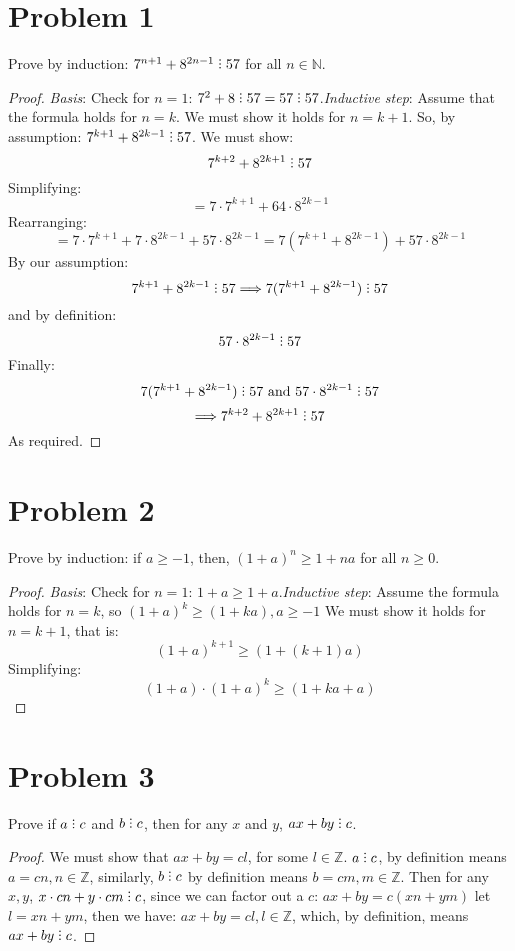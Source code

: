 \documentclass[12pt]{article}
\title{\scalebox{2}{Math 341 Exam 1}}
\author{\scalebox{1.5}{Theo Koss}}
\date{September 2020}
\newcommand{\N}{\mathbb{N}}
\newcommand{\Z}{\mathbb{Z}}
\newcommand{\divby}{%
  \mathrel{\text{\vbox{\baselineskip.65ex\lineskiplimit0pt\hbox{.}\hbox{.}\hbox{.}}}}%
  }
\begin{document}
\maketitle
\section{Problem 1}
Prove by induction: $7^{n+1}+8^{2n-1}\divby57$ for all $n\in\N$.
\begin{proof}
\emph{Basis}: Check for $n=1$: $7^2+8\divby57=57\divby57$.\newline \emph{Inductive step}: Assume that the formula holds for $n=k$. We must show it holds for $n=k+1$. So, by assumption: $7^{k+1}+8^{2k-1}\divby57$. We must show: $$7^{k+2}+8^{2k+1}\divby57$$ Simplifying:$$=7\cdot7^{k+1}+64\cdot8^{2k-1}$$ Rearranging:$$=7\cdot7^{k+1}+7\cdot8^{2k-1}+57\cdot8^{2k-1}=7(7^{k+1}+8^{2k-1})+57\cdot8^{2k-1}$$By our assumption:$$7^{k+1}+8^{2k-1}\divby57\Longrightarrow 7(7^{k+1}+8^{2k-1})\divby57$$ and by definition:$$57\cdot8^{2k-1}\divby57$$ Finally:$$7(7^{k+1}+8^{2k-1})\divby57\text{ and } 57\cdot8^{2k-1}\divby57$$ $$\Longrightarrow 7^{k+2}+8^{2k+1}\divby57$$ As required.
\end{proof}
\section{Problem 2}
Prove by induction: if $a\geq-1$, then, $(1+a)^n\geq1+na$ for all $n\geq0$.
\begin{proof}
\emph{Basis}: Check for $n=1$: $1+a\geq1+a$.\newline \emph{Inductive step}: \newline Assume the formula holds for $n=k$, so $(1+a)^k\geq(1+ka), a\geq-1$ We must show it holds for $n=k+1$, that is: $$(1+a)^{k+1}\geq(1+(k+1)a)$$ Simplifying:$$(1+a)\cdot(1+a)^k\geq(1+ka+a)$$
\end{proof}
\section{Problem 3}
Prove if $a\divby c$ and $b\divby c$, then for any $x$ and $y$, $ax+by\divby c$.
\begin{proof}
We must show that $ax+by=cl$, for some $l\in\Z$. $a\divby c$, by definition means $a=cn, n\in\Z$, similarly, $b\divby c$ by definition means $b=cm, m\in\Z$. Then for any $x,y$, $x\cdot cn+y\cdot cm \divby c$, since we can factor out a $c$: $ax+by=c(xn+ym)$ let $l=xn+ym$, then we have: $ax+by=cl, l\in\Z$, which, by definition, means $ax+by\divby c$.
\end{proof}
\end{document}
